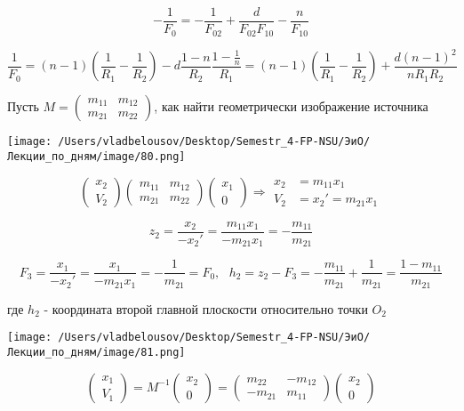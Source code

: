 \documentclass[12pt, a4paper]{report}
\begin{document}
\[ -\frac{1}{F_0 } = - \frac{1}{F_{02} }+ \frac{d}{F_{02} F_{10} } - \frac{n}{F_{10}}     \] 

\[ \frac{1}{F_0 } = (n -1 ) \left(  \frac{1}{R_1 } - \frac{1}{R_2 }    \right)  - d \frac{ 1 - n }{R_2 } \frac{1 - \frac{1}{n } }{R_1  } = (n -1 ) \left( \frac{1}{R_1 } - \frac{1}{R_2 }      \right) + \frac{d (n-1 ) ^2 }{n R_1 R_2 }     \] 

Пусть \( M = \begin{pmatrix}
m_{11}   & m_{12}\\
m_{21} & m_{22}
\end{pmatrix} \), как найти геометрически изображение источника 

\begin{center}
    \texttt{[image: /Users/vladbelousov/Desktop/Semestr\_4-FP-NSU/ЭиО/Лекции\_по\_дням/image/80.png]}
\end{center} 

\[ \begin{pmatrix}
    x_2\\
    V_2 
    \end{pmatrix}
    \begin{pmatrix}
        m_{11}   & m_{12}\\
        m_{21}  & m_{22}  
    \end{pmatrix}
    \begin{pmatrix}
        x_1 \\
        0
    \end{pmatrix}
\Rightarrow \begin{aligned}
x_2 &= m_{11} x_1 \\
V_2 &= x_2 ' = m_{21} x_1 
\end{aligned}    
\] 

\[ z_2 = \frac{x_2}{- x_2 ' } = \frac{m_{11} x_1 }{- m_{21} x_1 }= - \frac{m_{11}}{m_{21}}    \] 

\[ F_3 = \frac{x_1}{- x_2 ' } = \frac{x_1}{ - m_{21} x_1 } = - \frac{1}{m_{21}} = F_0 ,\text{ } h_2 = z_2 - F_3 = - \frac{m_{11}}{m_{21} } + \frac{1}{m_{21} } = \frac{1 - m_{11} }{m_{21}}       \] 

где \( h_2  \) - координата второй главной плоскости относительно точки \( O_2  \) 

\begin{center}
    \texttt{[image: /Users/vladbelousov/Desktop/Semestr\_4-FP-NSU/ЭиО/Лекции\_по\_дням/image/81.png]}
\end{center} 

\[ \begin{pmatrix}
x_1 \\
V_1 
\end{pmatrix} = M^{-1 }
\begin{pmatrix}
    x_2 \\
    0 
\end{pmatrix} =
\begin{pmatrix}
m_{22} & -m_{12}\\
-m_{21} & m_{11}
\end{pmatrix}\begin{pmatrix}
    x_2\\
    0 
\end{pmatrix}\] 
\end{document}
